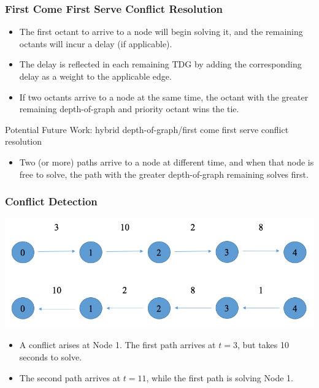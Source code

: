 \documentclass[xcolor={usenames,dvipsnames,svgnames,table}]{beamer}
\begin{document}
\begin{frame}[t]\frametitle{First Come First Serve Conflict Resolution}
\begin{block}{}
\begin{itemize}
	\item The first octant to arrive to a node will begin solving it, and the remaining octants will incur a delay (if applicable).
	\item The delay is reflected in each remaining TDG by adding the corresponding delay as a weight to the applicable edge.
	\item If two octants arrive to a node at the same time, the octant with the greater remaining depth-of-graph and priority octant wins the tie.
\end{itemize}
\end{block}
\begin{block}{Potential Future Work: hybrid depth-of-graph/first come first serve conflict resolution}
\begin{itemize}
	\item Two (or more) paths arrive to a node at different time, and when that node is free to solve, the path with the greater depth-of-graph remaining solves first.
\end{itemize}
\end{block}
\end{frame}

\begin{frame}[t]\frametitle{Conflict Detection}
	\centering
 	\includegraphics[scale=0.35]{figures/preconflict.png}
	
	\begin{block}{}
		\begin{itemize}
			\item A conflict arises at Node 1. The first path arrives at $t=3$, but takes 10 seconds to solve.
			\item The second path arrives at $t= 11$, while the first path is solving Node 1.
		\end{itemize}
	\end{block}
\end{frame}
\end{document}
